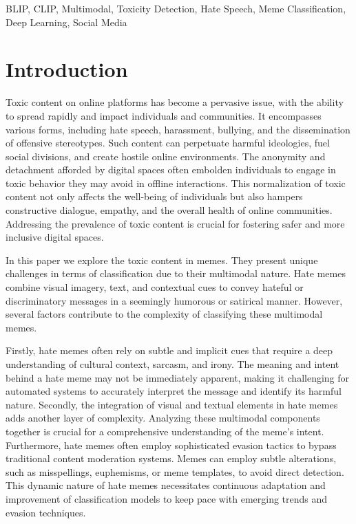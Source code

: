 \documentclass{ieeeaccess}
\begin{document}
\begin{keywords}
BLIP, CLIP, Multimodal, Toxicity Detection, Hate Speech, Meme Classification, Deep Learning, Social Media
\end{keywords}

\titlepgskip=-15pt

\maketitle

\section{Introduction}
\label{sec:introduction}

Toxic content on online platforms has become a pervasive issue, with the ability to spread rapidly and impact individuals and communities. It encompasses various forms, including hate speech, harassment, bullying, and the dissemination of offensive stereotypes. Such content can perpetuate harmful ideologies, fuel social divisions, and create hostile online environments. The anonymity and detachment afforded by digital spaces often embolden individuals to engage in toxic behavior they may avoid in offline interactions. This normalization of toxic content not only affects the well-being of individuals but also hampers constructive dialogue, empathy, and the overall health of online communities. Addressing the prevalence of toxic content is crucial for fostering safer and more inclusive digital spaces.

In this paper we explore the toxic content in memes. They present unique challenges in terms of classification due to their multimodal nature. Hate memes combine visual imagery, text, and contextual cues to convey hateful or discriminatory messages in a seemingly humorous or satirical manner. However, several factors contribute to the complexity of classifying these multimodal memes.

Firstly, hate memes often rely on subtle and implicit cues that require a deep understanding of cultural context, sarcasm, and irony. The meaning and intent behind a hate meme may not be immediately apparent, making it challenging for automated systems to accurately interpret the message and identify its harmful nature. Secondly, the integration of visual and textual elements in hate memes adds another layer of complexity. Analyzing these multimodal components together is crucial for a comprehensive understanding of the meme's intent. Furthermore, hate memes often employ sophisticated evasion tactics to bypass traditional content moderation systems. Memes can employ subtle alterations, such as misspellings, euphemisms, or meme templates, to avoid direct detection. This dynamic nature of hate memes necessitates continuous adaptation and improvement of classification models to keep pace with emerging trends and evasion techniques.
\end{document}
